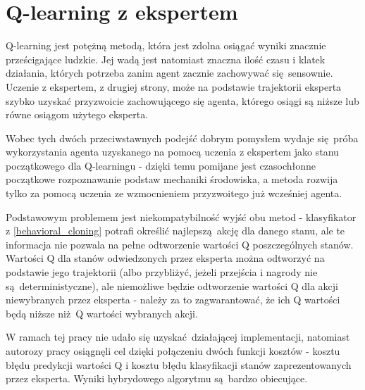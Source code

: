 \section{Q-learning z ekspertem}
Q-learning jest potężną metodą, która jest zdolna osiągać wyniki znacznie prześcigające ludzkie. Jej wadą jest natomiast znaczna ilość czasu i klatek działania, których potrzeba zanim agent zacznie zachowywać się sensownie. Uczenie z ekspertem, z drugiej strony, może na podstawie trajektorii eksperta szybko uzyskać przyzwoicie zachowującego się agenta, którego osiągi są niższe lub równe osiągom użytego eksperta.

Wobec tych dwóch przeciwstawnych podejść dobrym pomysłem wydaje się próba wykorzystania agenta uzyskanego na pomocą uczenia z ekspertem jako stanu początkowego dla Q-learningu - dzięki temu pomijane jest czasochłonne początkowe rozpoznawanie podstaw mechaniki środowiska, a metoda rozwija tylko za pomocą uczenia ze wzmocnieniem przyzwoitego już wcześniej agenta.

Podstawowym problemem jest niekompatybilność wyjść obu metod - klasyfikator z \ref{behavioral_cloning} potrafi określić najlepszą akcję dla danego stanu, ale te informacja nie pozwala na pełne odtworzenie wartości Q poszczególnych stanów. Wartości Q dla stanów odwiedzonych przez eksperta można odtworzyć na podstawie jego trajektorii (albo przybliżyć, jeżeli przejścia i nagrody nie są deterministyczne), ale niemożliwe będzie odtworzenie wartości Q dla akcji niewybranych przez eksperta - należy za to zagwarantować, że ich Q wartości będą niższe niż Q wartości wybranych akcji.

W ramach tej pracy nie udało się uzyskać działającej implementacji, natomiast autorozy pracy \cite{DBLP:journals/corr/HesterVPLSPSDOA17} osiągnęli cel dzięki połączeniu dwóch funkcji kosztów - kosztu błędu predykcji wartości Q i kosztu błędu klasyfikacji stanów zaprezentowanych przez eksperta. Wyniki hybrydowego algorytmu są bardzo obiecujące.
